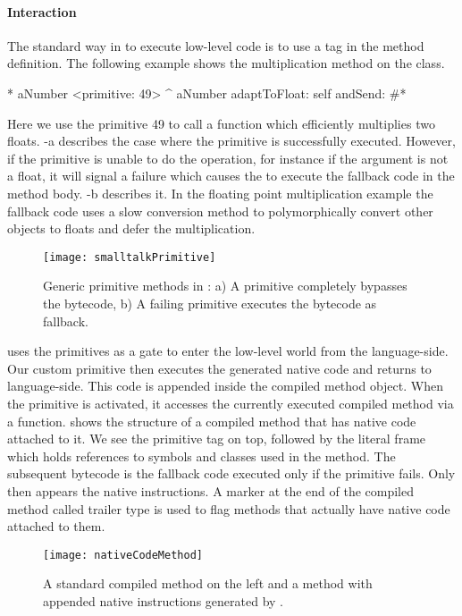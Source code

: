 \paragraph{\VM Interaction}

The standard way in \PH to execute low-level code is to use a tag in the method definition.
The following example shows the multiplication method on the  class.
%
\begin{stcode}[label={lst:benzo-basic-primitive}]{5}
* aNumber 
	<primitive: 49>
	^ aNumber adaptToFloat: self andSend: #*
\end{stcode}
%
Here we use the primitive 49 to call a \VM function which efficiently multiplies two floats. 
-a describes the case where the primitive is successfully executed.
However, if the primitive is unable to do the operation, for instance if the argument  is not a float, it will signal a failure which causes the \VM to execute the fallback \PH code in the method body.  
-b describes it. 
In the floating point multiplication example the fallback code uses a slow conversion method to polymorphically convert other objects to floats and defer the multiplication.


\begin{figure}[ht]
	\centering
	\texttt{[image: smalltalkPrimitive]}
	\caption[\PH Primitive]{Generic primitive methods in \PH: a) A primitive completely bypasses the bytecode, b) A failing primitive executes the bytecode as fallback.}
\end{figure}

\noindent \B uses the primitives as a gate to enter the low-level world from the language-side.
Our custom primitive then executes the generated native code and returns to language-side. 
This code is appended inside the compiled method object.
When the primitive is activated, it  accesses the currently executed compiled method via a \VM function. 
 shows the structure of a \PH compiled method that has native code attached to it.
We see the primitive tag on top, followed by the literal frame which holds references to symbols and classes used in the method.
The subsequent \PH bytecode is the fallback code executed only if the primitive fails. Only then appears the native instructions.
A marker at the end of the compiled method called trailer type is used to flag methods that actually have native code attached to them.
%
\begin{figure}[ht]
	\centering
	\texttt{[image: nativeCodeMethod]}
	\caption[\PH Compiled Method]{A standard \PH compiled method on the left and a method with appended native instructions generated by \B.}
\end{figure}


